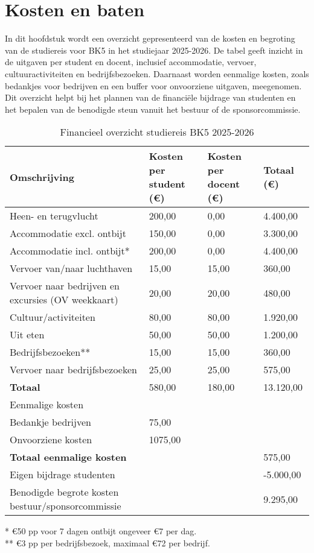 \section{Kosten en baten}

In dit hoofdstuk wordt een overzicht gepresenteerd van de kosten en begroting van de studiereis voor BK5 in het studiejaar 2025-2026. De tabel geeft inzicht in de uitgaven per student en docent, inclusief accommodatie, vervoer, cultuuractiviteiten en bedrijfsbezoeken. Daarnaast worden eenmalige kosten, zoals bedankjes voor bedrijven en een buffer voor onvoorziene uitgaven, meegenomen. Dit overzicht helpt bij het plannen van de financiële bijdrage van studenten en het bepalen van de benodigde steun vanuit het bestuur of de sponsorcommissie.

\begin{table}[h!]
	\centering
	\caption{Financieel overzicht studiereis BK5 2025-2026}
	\label{tab:financien}
	\begin{tabular}{|l|l|l|l|}
		\hline
		\textbf{Omschrijving} & \textbf{Kosten per student (€)} & \textbf{Kosten per docent (€)} & \textbf{Totaal (€)} \\
		\hline
		Heen- en terugvlucht & 200,00 & 0,00 & 4.400,00 \\
		\hline
		Accommodatie excl. ontbijt & 150,00 & 0,00 & 3.300,00 \\
		\hline
		Accommodatie incl. ontbijt* & 200,00 & 0,00 & 4.400,00 \\
		\hline
		Vervoer van/naar luchthaven & 15,00 & 15,00 & 360,00 \\
		\hline
		Vervoer naar bedrijven en excursies (OV weekkaart) & 20,00 & 20,00 & 480,00 \\
		\hline
		Cultuur/activiteiten & 80,00 & 80,00 & 1.920,00 \\
		\hline
		Uit eten & 50,00 & 50,00 & 1.200,00 \\
		\hline
		Bedrijfsbezoeken** & 15,00 & 15,00 & 360,00 \\
		\hline
		Vervoer naar bedrijfsbezoeken & 25,00 & 25,00 & 575,00 \\
		\hline
		\textbf{Totaal} & 580,00 & 180,00 & 13.120,00 \\
		\hline
		Eenmalige kosten & & & \\
		\hline
		Bedankje bedrijven & 75,00 & & \\
		\hline
		Onvoorziene kosten & 1075,00 & & \\
		\hline
		\textbf{Totaal eenmalige kosten} & & & 575,00 \\
		\hline
		Eigen bijdrage studenten & & & -5.000,00 \\
		\hline
		Benodigde begrote kosten bestuur/sponsorcommissie & & & 9.295,00 \\
		\hline
	\end{tabular}
	
	\vspace{0.5em}
	\footnotesize{* €50 pp voor 7 dagen ontbijt ongeveer €7 per dag. \\
		** €3 pp per bedrijfsbezoek, maximaal €72 per bedrijf.}
\end{table}